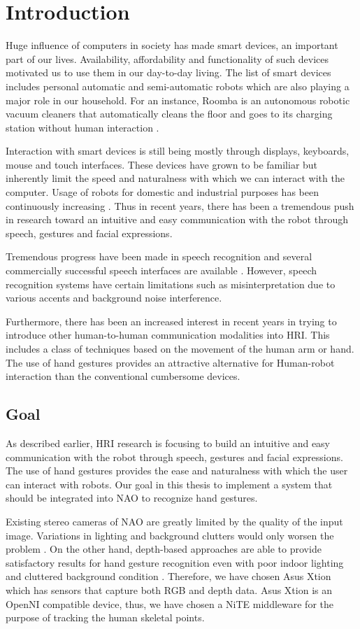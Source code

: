 \chapter{Introduction} Huge influence of computers in society has made smart devices, an important part of our lives. Availability, affordability and functionality of such devices motivated us to use them in our day-to-day living. The list of smart devices includes personal automatic and semi-automatic robots which are also playing a major role in our household. For an instance, Roomba is an autonomous robotic vacuum cleaners that automatically cleans the floor and goes to its charging station without human interaction \cite{4}.

Interaction with smart devices is still being mostly through displays, keyboards, mouse and touch interfaces. These devices have grown to be familiar but inherently limit the speed and naturalness with which we can interact with the computer. Usage of robots for domestic and industrial purposes has been continuously increasing \cite{5}. Thus in recent years, there has been a tremendous push in research toward an intuitive and easy communication with the robot through speech, gestures and facial expressions.

Tremendous progress have been made in speech recognition and several commercially successful speech interfaces are available \cite{6}. However, speech recognition systems have certain limitations such as misinterpretation due to various accents and background noise interference.

Furthermore, there has been an increased interest in recent years in trying to introduce other human-to-human communication modalities into HRI. This includes a class of techniques based on the movement of the human arm or hand. The use of hand gestures provides an attractive alternative for Human-robot interaction than the conventional cumbersome devices.


\section{Goal} As described earlier, HRI research is focusing to build an intuitive and easy communication with the robot through speech, gestures and facial expressions. The use of hand gestures provides the ease and naturalness with which the user can interact with robots. Our goal in this thesis to implement a system that should be integrated into NAO to recognize hand gestures. 

Existing stereo cameras of NAO are greatly limited by the quality of the input image. Variations in lighting and background clutters would only worsen the problem \cite{17}. On the other hand, depth-based approaches are able to provide satisfactory results for hand gesture recognition even with poor indoor lighting and cluttered background condition \cite{18}. Therefore, we have chosen Asus Xtion which has sensors that capture both RGB and depth data. Asus Xtion is an OpenNI compatible device, thus, we have chosen a NiTE middleware for the purpose of tracking the human skeletal points. 

